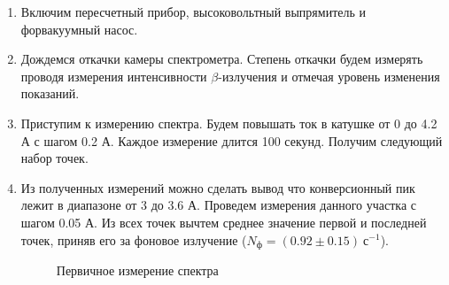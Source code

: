 \documentclass[14pt, a4paper]{report}
\begin{document}
\begin{enumerate}

\item Включим пересчетный прибор, высоковольтный выпрямитель и форвакуумный насос.

\item Дождемся откачки камеры спектрометра. Степень откачки будем измерять проводя измерения интенсивности $\beta$-излучения и отмечая уровень изменения показаний.

\item Приступим к измерению спектра. Будем повышать ток в катушке от 0 до 4.2 А с шагом 0.2 А. Каждое измерение длится 100 секунд. Получим следующий набор точек.

\item Из полученных измерений можно сделать вывод что конверсионный пик лежит в диапазоне от 3 до 3.6 А. Проведем измерения данного участка с шагом 0.05 А. Из всех точек вычтем среднее значение первой и последней точек, приняв его за фоновое излучение ($N_{ф}=(0.92\pm0.15)\ с^{-1}$).

\begin{figure}[H]
\centering
{}
\caption{Первичное измерение спектра}
\end{figure}


\end{enumerate}
\end{document}
